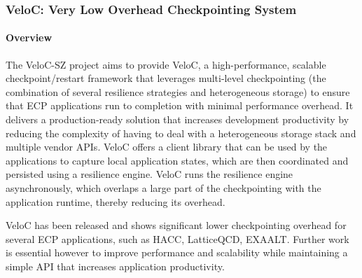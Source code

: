 \subsubsection{ VeloC: Very Low Overhead Checkpointing System} 

\paragraph{Overview} 

The VeloC-SZ project aims to provide VeloC, a high-performance, scalable
checkpoint/restart framework that leverages multi-level checkpointing
(the combination of several resilience strategies and heterogeneous
storage) to ensure that ECP applications run to completion with
minimal performance overhead. It delivers a production-ready solution
that increases development productivity by reducing the complexity of
having to deal with a heterogeneous storage stack and multiple vendor
APIs. VeloC offers a client library that can be used by the
applications to capture local application states, which are then
coordinated and persisted using a resilience engine.  VeloC runs the resilience engine asynchronously, which overlaps a large part of the checkpointing
with the application runtime, thereby reducing its overhead.

VeloC has been released and shows significant lower checkpointing
overhead for several ECP applications, such as HACC, LatticeQCD, 
EXAALT. Further work is essential however to improve performance
and scalability while maintaining a simple API that increases application 
productivity. 

